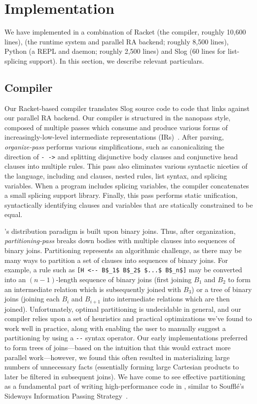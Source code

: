 \section{Implementation}

We have implemented \slog{} in a combination of Racket (the compiler,
roughly 10,600 lines), \CC{} (the runtime system and parallel RA
backend; roughly 8,500 lines), Python (a REPL and daemon; roughly
2,500 lines) and Slog (60 lines for list-splicing support). In this
section, we describe relevant particulars.

\subsection{Compiler}

Our Racket-based compiler translates Slog source code to \CC{} code
that links against our parallel RA backend. Our compiler is structured
in the nanopass style, composed of multiple passes which consume and
produce various forms of increasingly-low-level intermediate
representations (IRs)~\cite{nanopass}. After parsing,
\emph{organize-pass} performs various simplifications, such as
canonicalizing the direction of \texttt{-\ \!\!\!\!->} and splitting disjunctive
body clauses and conjunctive head clauses into multiple rules.
This pass also eliminates various syntactic niceties of the language, including \text{!} and 
clauses, nested rules, list syntax, and splicing variables. When a
program includes splicing variables, the compiler concatenates a small
splicing support library. Finally, this pass performs static
unification, syntactically identifying clauses and variables that are
statically constrained to be equal.

\slog{}'s distribution paradigm is built upon
binary joins. Thus, after organization, \emph{partitioning-pass}
breaks down bodies with multiple clauses into sequences of binary
joins. Partitioning represents an algorithmic challenge, as there may
be many ways to partition a set of clauses into sequences of binary
joins. For example, a rule such as
\lstinline[mathescape]{[H <-- B$_1$ B$_2$ $...$ B$_n$]}
may be converted into an $(n-1)$-length sequence of
binary joins (first joining $B_1$ and $B_2$ to form an intermediate
relation which is subsequently joined with $B_3$) or a tree of binary
joins (joining each $B_i$ and $B_{i+1}$ into intermediate relations
which are then joined). Unfortunately, optimal partitioning is
undecidable in general, and our compiler relies upon a set of
heuristics and practical optimizations we've found to work well in practice, along
with enabling the user to manually suggest a partitioning by using
a \lstinline{--} syntax operator. Our early implementations preferred
to form trees of joins---based on the intuition that this would extract
more parallel work---however, we found this often resulted in materializing
large numbers of unnecessary facts (essentially forming large Cartesian
products to later be filtered in subsequent joins). We have come to
see effective partitioning as a fundamental part of writing
high-performance code in \slog{}, similar to Souffl\'e's Sideways
Information Passing Strategy~\cite{soufflesips}.

